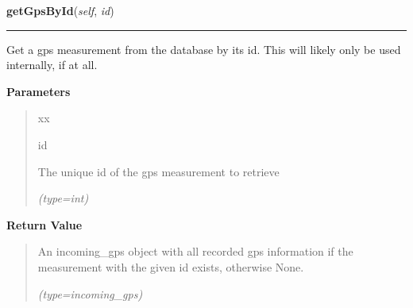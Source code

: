 \hspace{.8\funcindent}\begin{boxedminipage}{\funcwidth}

    \raggedright \textbf{getGpsById}(\textit{self}, \textit{id})

    \vspace{-1.5ex}

    \rule{\textwidth}{0.5\fboxrule}
\setlength{\parskip}{2ex}
    Get a gps measurement from the database by its id. This will likely 
    only be used internally, if at all.

\setlength{\parskip}{1ex}
      \textbf{Parameters}
      \vspace{-1ex}

      \begin{quote}
        \begin{Ventry}{xx}

          \item[id]

          The unique id of the gps measurement to retrieve

            {\it (type=int)}

        \end{Ventry}

      \end{quote}

      \textbf{Return Value}
    \vspace{-1ex}

      \begin{quote}
      An incoming\_gps object with all recorded gps information if the 
      measurement with the given id exists, otherwise None.

      {\it (type=incoming\_gps)}

      \end{quote}

    \end{boxedminipage}

    \label{src:dao:incoming_gps_dao:IncomingGpsDAO:getGpsByClosestTS}

    \vspace{0.5ex}


